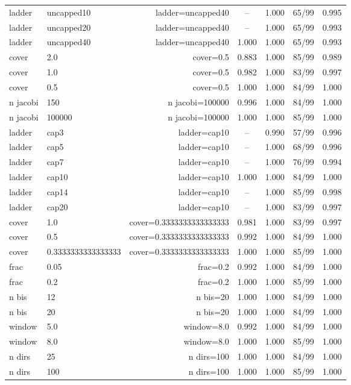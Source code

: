\begin{tabular*}{\linewidth}{@{\extracolsep{\fill}}llrcccc@{}}
ladder & uncapped10 & ladder=uncapped40 & -- & 1.000 & 65/99 & 0.995\\
ladder & uncapped20 & ladder=uncapped40 & -- & 1.000 & 65/99 & 0.993\\
ladder & uncapped40 & ladder=uncapped40 & 1.000 & 1.000 & 65/99 & 0.993\\
cover & 2.0 & cover=0.5 & 0.883 & 1.000 & 85/99 & 0.989\\
cover & 1.0 & cover=0.5 & 0.982 & 1.000 & 83/99 & 0.997\\
cover & 0.5 & cover=0.5 & 1.000 & 1.000 & 84/99 & 1.000\\
n jacobi & 150 & n jacobi=100000 & 0.996 & 1.000 & 84/99 & 1.000\\
n jacobi & 100000 & n jacobi=100000 & 1.000 & 1.000 & 85/99 & 1.000\\
ladder & cap3 & ladder=cap10 & -- & 0.990 & 57/99 & 0.996\\
ladder & cap5 & ladder=cap10 & -- & 1.000 & 68/99 & 0.996\\
ladder & cap7 & ladder=cap10 & -- & 1.000 & 76/99 & 0.994\\
ladder & cap10 & ladder=cap10 & 1.000 & 1.000 & 84/99 & 1.000\\
ladder & cap14 & ladder=cap10 & -- & 1.000 & 85/99 & 0.998\\
ladder & cap20 & ladder=cap10 & -- & 1.000 & 83/99 & 0.997\\
cover & 1.0 & cover=0.3333333333333333 & 0.981 & 1.000 & 83/99 & 0.997\\
cover & 0.5 & cover=0.3333333333333333 & 0.992 & 1.000 & 84/99 & 1.000\\
cover & 0.3333333333333333 & cover=0.3333333333333333 & 1.000 & 1.000 & 85/99 & 1.000\\
frac & 0.05 & frac=0.2 & 0.992 & 1.000 & 84/99 & 1.000\\
frac & 0.2 & frac=0.2 & 1.000 & 1.000 & 85/99 & 1.000\\
n bis & 12 & n bis=20 & 1.000 & 1.000 & 84/99 & 1.000\\
n bis & 20 & n bis=20 & 1.000 & 1.000 & 84/99 & 1.000\\
window & 5.0 & window=8.0 & 0.992 & 1.000 & 84/99 & 1.000\\
window & 8.0 & window=8.0 & 1.000 & 1.000 & 85/99 & 1.000\\
n dirs & 25 & n dirs=100 & 1.000 & 1.000 & 84/99 & 1.000\\
n dirs & 100 & n dirs=100 & 1.000 & 1.000 & 85/99 & 1.000\\
\bottomrule
\end{tabular*}
